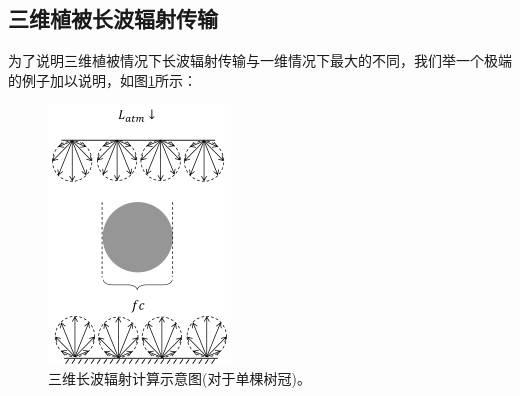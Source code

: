 \subsection{三维植被长波辐射传输}\label{三维植被长波辐射传输}
为了说明三维植被情况下长波辐射传输与一维情况下最大的不同，我们举一个极端的例子加以说明，如图\ref{fig:单颗树冠长波辐射传输示意图}所示：
{
\begin{figure}[]
\centering
\includegraphics{Figures/辐射过程及辐射通量计算/单颗树冠长波辐射传输示意图.png}
\caption{三维长波辐射计算示意图(对于单棵树冠)。}
\label{fig:单颗树冠长波辐射传输示意图}
\end{figure}
}

